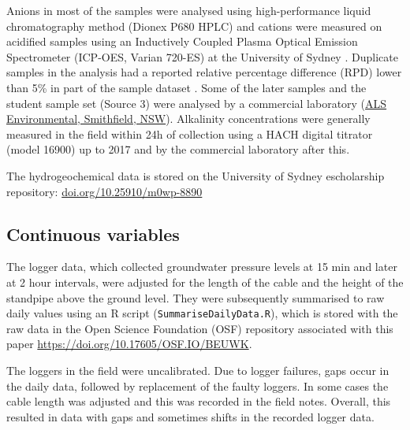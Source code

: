 \documentclass[, manuscript]{copernicus}
\begin{document}
Anions in most of the samples were analysed using high-performance
liquid chromatography method (Dionex P680 HPLC) and cations were
measured on acidified samples using an Inductively Coupled Plasma
Optical Emission Spectrometer (ICP-OES, Varian 720-ES) at the University
of Sydney \citep{Akter2018}. Duplicate samples in the analysis had a
reported relative percentage difference (RPD) lower than 5\% in part of
the sample dataset \citep{Akter2018}. Some of the later samples and the
student sample set (Source 3) were analysed by a commercial laboratory
(\href{https://www.alsglobal.com/en/locations/asia-pacific/pacific/australia/nsw/sydney-woodpark-environmental}{ALS
Environmental, Smithfield, NSW}). Alkalinity concentrations were
generally measured in the field within 24h of collection using a HACH
digital titrator (model 16900) \citep{Akter2018} up to 2017 and by the
commercial laboratory after this.

The hydrogeochemical data is stored on the University of Sydney
escholarship repository: \url{doi.org/10.25910/m0wp-8890}

\subsection{Continuous variables}

The logger data, which collected groundwater pressure levels at 15 min
and later at 2 hour intervals, were adjusted for the length of the cable
and the height of the standpipe above the ground level. They were
subsequently summarised to raw daily values using an R script
(\texttt{SummariseDailyData.R}), which is stored with the raw data in
the Open Science Foundation (OSF) repository associated with this paper
\url{https://doi.org/10.17605/OSF.IO/BEUWK}.

The loggers in the field were uncalibrated. Due to logger failures, gaps
occur in the daily data, followed by replacement of the faulty loggers.
In some cases the cable length was adjusted and this was recorded in the
field notes. Overall, this resulted in data with gaps and sometimes
shifts in the recorded logger data.
\end{document}
